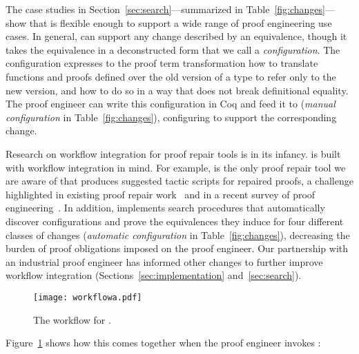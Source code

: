 The case studies in Section~\ref{sec:search}---summarized in Table~\ref{fig:changes}---show that \toolname is flexible enough to support
a wide range of proof engineering use cases. %
In general, \toolname can support any change described by an equivalence, though it takes the equivalence in a
deconstructed form that we call a \textit{configuration}.
The configuration expresses to the proof term transformation how to translate functions and proofs defined over the old version of a type
to refer only to the new version, and how to do so in a way that does not break definitional equality.
The proof engineer can write this configuration in Coq and feed it to \toolname (\textit{manual configuration} in Table~\ref{fig:changes}),
configuring \toolname to support the corresponding change. %

Research on workflow integration for proof repair tools is in its infancy.
\toolname is built with workflow integration in mind.
For example, \toolname is the only proof repair tool we are aware of that produces suggested tactic scripts for repaired proofs,
a challenge highlighted in existing proof repair work~\cite{pumpkinpatch, robert2018} and in 
a recent survey of proof engineering~\cite{PGL-045}.
In addition, \toolname implements search procedures that 
automatically discover configurations and prove the equivalences they induce for four different classes of 
changes (\textit{automatic configuration} in Table~\ref{fig:changes}),
decreasing the burden of proof obligations imposed on the proof engineer.
Our partnership with an industrial proof engineer has informed other changes to further improve workflow integration
(Sections~\ref{sec:implementation} and~\ref{sec:search}).

\begin{figure}
\texttt{[image: workflowa.pdf]}
\vspace{-0.7cm}
\caption{The workflow for \toolname.}
\vspace{-0.1cm}
\label{fig:system}
\end{figure}

Figure~\ref{fig:system} shows how this comes together when the proof engineer invokes \toolname:


